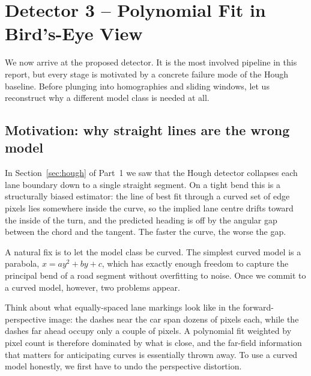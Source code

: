 
\section{Detector 3 -- Polynomial Fit in Bird's-Eye View}
\label{sec:polyfit}

We now arrive at the proposed detector. It is the most involved
pipeline in this report, but every stage is motivated by a concrete
failure mode of the Hough baseline. Before plunging into homographies
and sliding windows, let us reconstruct why a different model class is
needed at all.

\subsection{Motivation: why straight lines are the wrong model}

In Section~\ref{sec:hough} of Part~1 we saw that the Hough detector
collapses each lane boundary down to a single straight segment. On a
tight bend this is a structurally biased estimator: the line of best
fit through a curved set of edge pixels lies somewhere inside the
curve, so the implied lane centre drifts toward the inside of the
turn, and the predicted heading is off by the angular gap between the
chord and the tangent. The faster the curve, the worse the gap.

A natural fix is to let the model class be curved. The simplest curved
model is a parabola, $x = a y^2 + b y + c$, which has exactly enough
freedom to capture the principal bend of a road segment without
overfitting to noise. Once we commit to a curved model, however, two
problems appear.

\begin{intuition}
Think about what equally-spaced lane markings look like in the
forward-perspective image: the dashes near the car span dozens of
pixels each, while the dashes far ahead occupy only a couple of
pixels. A polynomial fit weighted by pixel count is therefore
dominated by what is close, and the far-field information that matters
for anticipating curves is essentially thrown away. To use a curved
model honestly, we first have to undo the perspective distortion.
\end{intuition}

